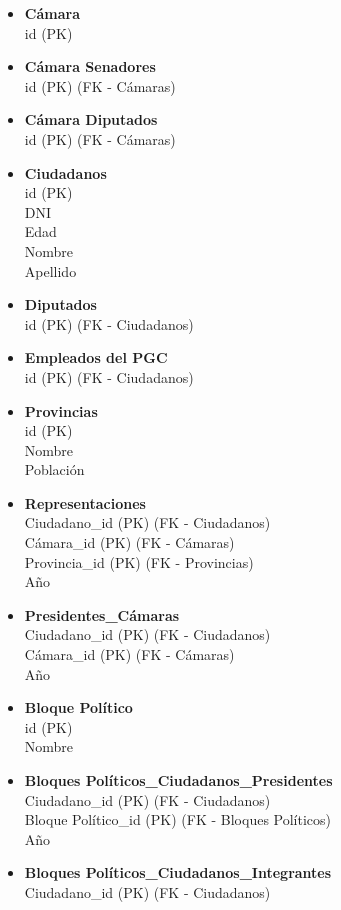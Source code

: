 \begin{itemize}
	\item \textbf{Cámara} \\
	id (PK)
	\item \textbf{Cámara Senadores} \\
	id (PK) (FK - Cámaras)
	\item \textbf{Cámara Diputados} \\
	id (PK) (FK - Cámaras)
	\item \textbf{Ciudadanos} \\
	id (PK) \\
	DNI \\
	Edad \\
	Nombre \\
	Apellido
	\item \textbf{Diputados} \\
	id (PK) (FK - Ciudadanos)
	\item \textbf{Empleados del PGC} \\
	id (PK) (FK - Ciudadanos)
	\item \textbf{Provincias} \\
	id (PK) \\
	Nombre \\
	Población
	\item \textbf{Representaciones} \\
	Ciudadano\_id (PK) (FK - Ciudadanos) \\
	Cámara\_id (PK) (FK - Cámaras) \\
	Provincia\_id (PK) (FK - Provincias) \\
	Año
	\item \textbf{Presidentes\_Cámaras} \\
	Ciudadano\_id (PK) (FK - Ciudadanos)\\
	Cámara\_id (PK) (FK - Cámaras) \\
	Año
	\item \textbf{Bloque Político} \\
	id (PK) \\
	Nombre
	\item \textbf{Bloques Políticos\_Ciudadanos\_Presidentes} \\
	Ciudadano\_id (PK) (FK - Ciudadanos) \\
	Bloque Político\_id (PK) (FK - Bloques Políticos)\\
	Año
	\item \textbf{Bloques Políticos\_Ciudadanos\_Integrantes} \\
	Ciudadano\_id (PK) (FK - Ciudadanos) \\

\end{itemize}
